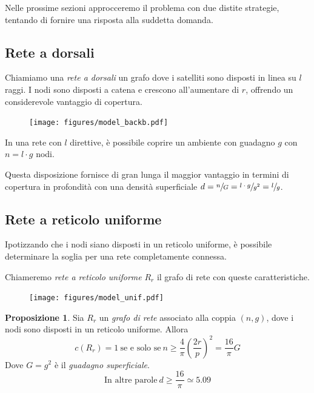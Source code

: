\documentclass[a4paper,12pt]{article}
\theoremstyle{definition}
\newtheorem{proposition}{Proposizione}
\begin{document}
Nelle prossime sezioni approcceremo il problema con due distite strategie, tentando di fornire una risposta alla suddetta domanda.

\subsection{Rete a dorsali}

Chiamiamo una \emph{rete a dorsali} un grafo dove i satelliti sono disposti in linea su $l$ raggi. I nodi sono disposti a catena e crescono all'aumentare di $r$, offrendo un considerevole vantaggio di copertura.

\begin{figure}[H]
\centering
\texttt{[image: figures/model\_backb.pdf]}
\caption{}
\end{figure}

In una rete con $l$ direttive, è possibile coprire un ambiente con guadagno $g$ con $n = l \cdot g$ nodi.

Questa disposizione fornisce di gran lunga il maggior vantaggio in termini di copertura in profondità con una densità superficiale $d = \sfrac{n}{G} = \sfrac{l \cdot g}{g^2} = \sfrac{l}{g}$.

\subsection{Rete a reticolo uniforme}

Ipotizzando che i nodi siano disposti in un reticolo uniforme, è possibile determinare la soglia per una rete completamente connessa.

Chiameremo \emph{rete a reticolo uniforme} $R_r$ il grafo di rete con queste caratteristiche.

\begin{figure}[H]
\centering
\texttt{[image: figures/model\_unif.pdf]}
\caption{}
\end{figure}

\begin{proposition}
Sia $R_r$ un \emph{grafo di rete} associato alla coppia $(n, g)$, dove i nodi sono disposti in un reticolo uniforme. Allora
\begin{equation*}
c(R_r) = 1 \ \text{se e solo se} \ n \geq \frac{4}{\pi} \left(\frac{2r}{p}\right)^2 = \frac{16}{\pi} G
\end{equation*}
Dove $G = g^2$ è il \emph{guadagno superficiale}.
\begin{equation*}
\text{In altre parole} \ d \geq \frac{16}{\pi} \simeq 5.09
\end{equation*}
\end{proposition}
\end{document}
